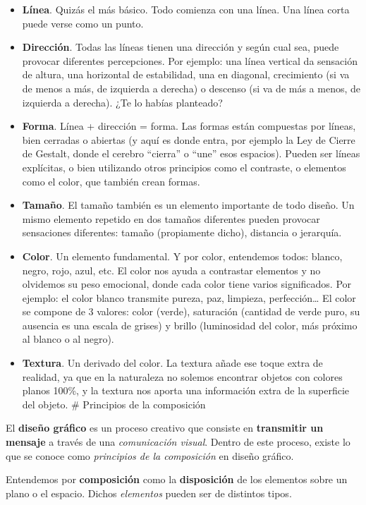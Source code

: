\documentclass[16pt,]{krantz}
\theoremstyle{definition}
\theoremstyle{definition}
\theoremstyle{definition}
\theoremstyle{definition}
\theoremstyle{remark}
\begin{document}
\begin{itemize}
\item
  \textbf{Línea}. Quizás el más básico. Todo comienza con una línea. Una línea corta puede verse como un punto.
\item
  \textbf{Dirección}. Todas las líneas tienen una dirección y según cual sea, puede provocar diferentes percepciones. Por ejemplo: una línea vertical da sensación de altura, una horizontal de estabilidad, una en diagonal, crecimiento (si va de menos a más, de izquierda a derecha) o descenso (si va de más a menos, de izquierda a derecha). ¿Te lo habías planteado?
\item
  \textbf{Forma}. Línea + dirección = forma. Las formas están compuestas por líneas, bien cerradas o abiertas (y aquí es donde entra, por ejemplo la Ley de Cierre de Gestalt, donde el cerebro ``cierra'' o ``une'' esos espacios). Pueden ser líneas explícitas, o bien utilizando otros principios como el contraste, o elementos como el color, que también crean formas.
\item
  \textbf{Tamaño}. El tamaño también es un elemento importante de todo diseño. Un mismo elemento repetido en dos tamaños diferentes pueden provocar sensaciones diferentes: tamaño (propiamente dicho), distancia o jerarquía.
\item
  \textbf{Color}. Un elemento fundamental. Y por color, entendemos todos: blanco, negro, rojo, azul, etc. El color nos ayuda a contrastar elementos y no olvidemos su peso emocional, donde cada color tiene varios significados. Por ejemplo: el color blanco transmite pureza, paz, limpieza, perfección\ldots{} El color se compone de 3 valores: color (verde), saturación (cantidad de verde puro, su ausencia es una escala de grises) y brillo (luminosidad del color, más próximo al blanco o al negro).
\item
  \textbf{Textura}. Un derivado del color. La textura añade ese toque extra de realidad, ya que en la naturaleza no solemos encontrar objetos con colores planos 100\%, y la textura nos aporta una información extra de la superficie del objeto. \# Principios de la composición
\end{itemize}

El \textbf{diseño gráfico} es un proceso creativo que consiste en \textbf{transmitir un mensaje} a través de una \emph{comunicación visual}. Dentro de este proceso, existe lo que se conoce como \emph{principios de la composición} en diseño gráfico.

Entendemos por \textbf{composición} como la \textbf{disposición} de los elementos sobre un plano o el espacio. Dichos \emph{elementos} pueden ser de distintos tipos.
\end{document}
